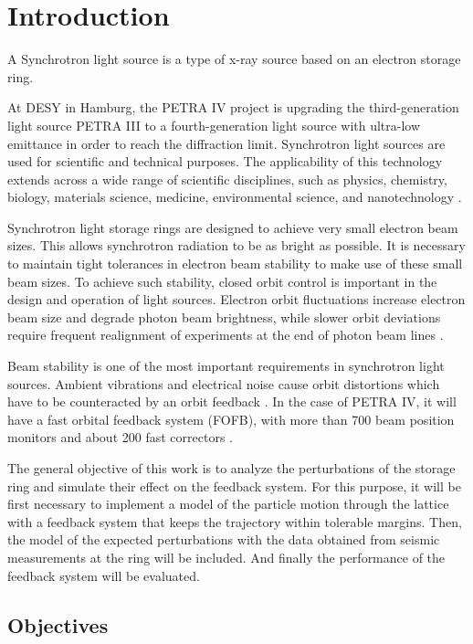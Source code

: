 \chapter{Introduction}
\label{cha:Introduction}

A Synchrotron light source is a type of x-ray source based on an electron storage ring.

At DESY in Hamburg, the PETRA IV project is upgrading the third-generation light source PETRA III to a fourth-generation light source  with ultra-low emittance in order to reach the diffraction limit. Synchrotron light sources  are used for scientific and technical purposes. The applicability of this technology extends  across a wide range of scientific disciplines, such as physics, chemistry, biology, materials  science, medicine, environmental science, and nanotechnology \cite{Schroer:426140}. 

Synchrotron light storage rings are designed to achieve very small electron beam sizes. This 
allows synchrotron radiation to be as bright as possible. It is necessary to maintain tight 
tolerances in electron beam stability to make use of these small beam sizes. To achieve 
such stability, closed orbit control is important in the design and operation of light sources. 
Electron orbit fluctuations increase electron beam size and degrade photon beam brightness, while slower orbit deviations require frequent realignment of experiments at the end of photon beam lines \cite{Safranek:1999fr}. 

Beam stability is one of the most important requirements in synchrotron light sources. Ambient vibrations and electrical noise cause orbit distortions which have to be counteracted 
by an orbit feedback \cite{sahoo2004closed}. In the case of PETRA IV, it will have a fast orbital feedback system (FOFB), with more than 700 beam position monitors and about 200 fast correctors \cite{Schroer:426140}.

The general objective of this work is to analyze the perturbations of the storage ring and simulate their effect on the feedback system.
For this purpose, it will be first necessary to implement a model of the particle motion through the lattice with a  feedback system that keeps the trajectory within tolerable margins. Then, the model of the expected perturbations with the data obtained from seismic measurements at the ring will be included. And finally the performance of the feedback system will be evaluated.

\section{Objectives}

